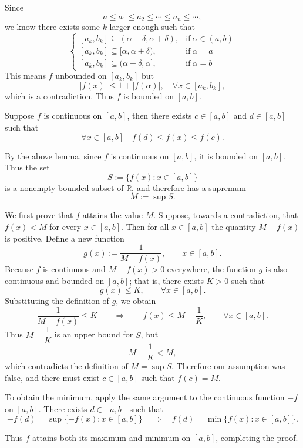\begin{proofenv}
		\noindent Since
		\[
		a\le a_1 \le a_2 \le \cdots \le a_n \le \cdots,
		\]
		we know there exists some $k$ larger enough such that
		\[
		\begin{cases}
			[a_k,b_k] \subseteq (\alpha-\delta, \alpha + \delta), & \text{if}\ \alpha\in (a,b)\\[4pt]
			[a_k,b_k] \subseteq [\alpha, \alpha + \delta), & \text{if}\ \alpha=a\\[4pt]
			[a_k,b_k] \subseteq (\alpha - \delta, \alpha], & \text{if}\ \alpha=b
		\end{cases}
		\]
		This means $f$ unbounded on $[a_k,b_k]$ but
		\[
		|f(x)| \le 1+|f(\alpha)|,\quad \forall x\in [a_k,b_k],
		\]
		which is a contradiction. Thus $f$ is bounded on $[a,b]$.
	\end{proofenv}

	\begin{theoremenv}
		Suppose $f$ is continuous on $[a,b]$, then there exists $c\in [a,b]$ and $d\in [a,b]$ such that
		\[
		\forall x \in [a,b] \quad f(d)\le f(x)\le f(c).
		\]
	\end{theoremenv}
	\begin{proofenv}
	By the above lemma, since $f$ is continuous on $[a,b]$, it is bounded on $[a,b]$.
	Thus the set 
	\[
	S := \{f(x): x\in[a,b]\}
	\]
	is a nonempty bounded subset of $\mathbb{R}$, and therefore has a supremum
	\[
	M := \sup S.
	\]

	We first prove that $f$ attains the value $M$. Suppose, towards a contradiction,
	that $f(x)<M$ for every $x\in[a,b]$. Then for all $x\in[a,b]$ the quantity
	$M-f(x)$ is positive. Define a new function
	\[
	g(x):=\frac{1}{M-f(x)},\qquad x\in[a,b].
	\]
	Because $f$ is continuous and $M-f(x)>0$ everywhere, the function $g$ is also continuous and bounded on $[a,b]$; that is,
	there exists $K>0$ such that
	\[
	g(x)\le K,\qquad \forall x\in[a,b].
	\]
	Substituting the definition of $g$, we obtain
	\[
	\frac{1}{M-f(x)}\le K
	\qquad\Longrightarrow\qquad
	f(x)\le M-\frac{1}{K},\qquad \forall x\in[a,b].
	\]
	Thus $M-\dfrac{1}{K}$ is an upper bound for $S$, but 
	\[
	M-\frac{1}{K}<M,
	\]
	which contradicts the definition of $M=\sup S$. Therefore our assumption was 
	false, and there must exist $c\in[a,b]$ such that $f(c)=M$.

	To obtain the minimum, apply the same argument to the continuous function 
	$-f$ on $[a,b]$. There exists $d\in[a,b]$ such that
	\[
	-f(d)=\sup\{-f(x):x\in[a,b]\}
	\quad\Longrightarrow\quad
	f(d)=\min\{f(x):x\in[a,b]\}.
	\]

	Thus $f$ attains both its maximum and minimum on $[a,b]$, completing the proof.
	\end{proofenv}
